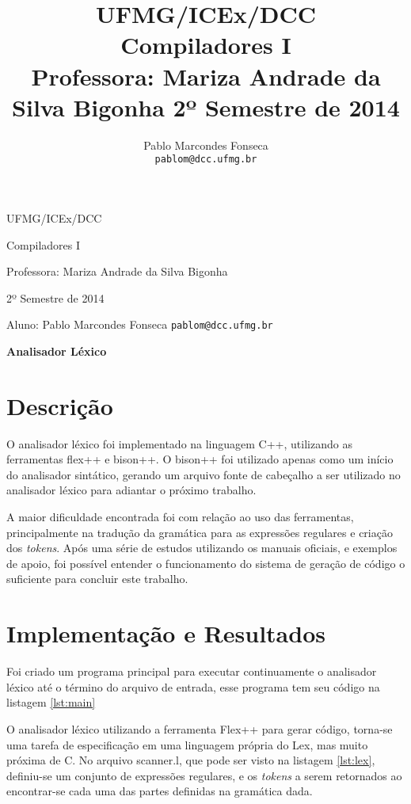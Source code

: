 \documentclass[12pt,a4paper]{article}
\title{\Large UFMG/ICEx/DCC\\
\Large Compiladores I\\
\large Professora: Mariza Andrade da Silva Bigonha
\normalsize 2º Semestre de 2014\\
}
\author{Pablo Marcondes Fonseca\\
\texttt{pablom@dcc.ufmg.br}}
\begin{document}
\centerline{\Large UFMG/ICEx/DCC}
\medskip
\centerline{\Large Compiladores I}
\medskip
\centerline{\large Professora: Mariza Andrade da Silva Bigonha}
\medskip
\centerline{\normalsize 2º Semestre de 2014}
\medskip
\centerline{\large Aluno: Pablo Marcondes Fonseca \texttt{pablom@dcc.ufmg.br}}
\bigskip
\centerline{\Large \textbf{Analisador Léxico}}

\section{Descrição}

O analisador léxico foi implementado na linguagem C++, utilizando as ferramentas flex++ e bison++. O bison++ foi utilizado apenas como um início do analisador sintático, gerando um arquivo fonte de cabeçalho a ser utilizado no analisador léxico para adiantar o próximo trabalho.

A maior dificuldade encontrada foi com relação ao uso das ferramentas, principalmente na tradução da gramática para as expressões regulares e criação dos \textit{tokens}. Após uma série de estudos utilizando os manuais oficiais, e exemplos de apoio, foi possível entender o funcionamento do sistema de geração de código o suficiente para concluir este trabalho.


\section{Implementação e Resultados}

Foi criado um programa principal para executar continuamente o analisador léxico até o término do arquivo de entrada, esse programa tem seu código na listagem \ref{lst:main}



\medskip
O analisador léxico utilizando a ferramenta Flex++ para gerar código, torna-se uma tarefa de especificação em uma linguagem própria do Lex, mas muito próxima de C. No arquivo scanner.l, que pode ser visto na listagem \ref{lst:lex}, definiu-se um conjunto de expressões regulares, e os \textit{tokens} a serem retornados ao encontrar-se cada uma das partes definidas na gramática dada.


\end{document}
